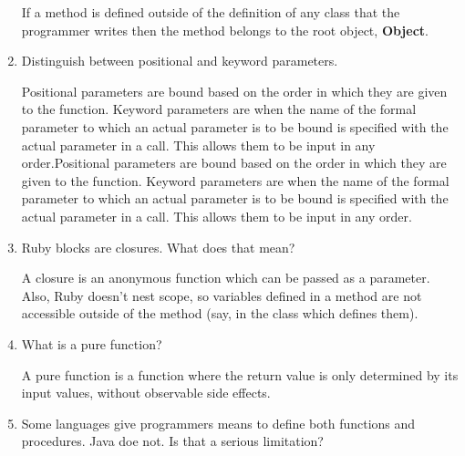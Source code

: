 \begin{enumerate}
\begin{answer}

If a method is defined outside of the definition of any class that the programmer
 writes then the method belongs to the root object, \textbf{Object}.
    \end{answer}

  \item Distinguish between positional and keyword parameters.

\begin{answer}
Positional parameters are bound based on the order in which they are given to the
 function. Keyword parameters are when the name of the formal parameter to which an
 actual parameter is to be bound is specified with the actual parameter in a call.
 This allows them to be input in any order.Positional parameters are bound based on
 the order in which they are given to the function. Keyword parameters are when the
 name of the formal parameter to which an actual parameter is to be bound is
 specified with the actual parameter in a call. This allows them to be input in any
 order.

    \end{answer}

  \item Ruby blocks are closures. What does that mean?

\begin{answer}

A closure is an anonymous function which can be passed as a parameter. Also, Ruby
 doesn't nest scope, so variables defined in a method are not accessible outside of
 the method (say, in the class which defines them).

    \end{answer}

  \item What is a pure function?

\begin{answer}


A pure function is a function where the return value is only determined by its
input values, without observable side effects.

    \end{answer}

  \item Some languages give programmers means to define
    both functions and procedures. Java doe not. Is that
    a serious limitation?

\begin{answer}


\end{answer}
\end{enumerate}
